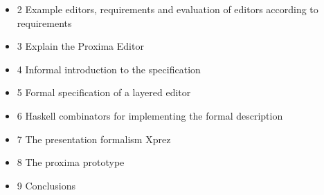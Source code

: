 \begin{itemize}
\item 2 Example editors, requirements and evaluation of editors according to requirements
\item 3 Explain the Proxima Editor
\item 4 Informal introduction to the specification
\item 5 Formal specification of a layered editor
\item 6 Haskell combinators for implementing the formal description
\item 7 The presentation formalism {\sc Xprez}
\item 8 The proxima prototype
\item 9 Conclusions
\end{itemize}



\ec